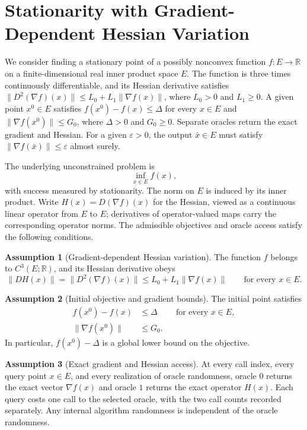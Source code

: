 \documentclass[10pt]{article}
\theoremstyle{definition}
\newtheorem{assumption}{Assumption}
\begin{document}
\section*{Stationarity with Gradient-Dependent Hessian Variation}
We consider finding a stationary point of a possibly nonconvex function $f:E\to\mathbb{R}$ on a finite-dimensional real inner product space $E$. The function is three times continuously differentiable, and its Hessian derivative satisfies $\|D^2(\nabla f)(x)\|\leq L_0+L_1\|\nabla f(x)\|$, where $L_0>0$ and $L_1\geq0$. A given point $x^0\in E$ satisfies $f(x^0)-f(x)\leq\Delta$ for every $x\in E$ and $\|\nabla f(x^0)\|\leq G_0$, where $\Delta>0$ and $G_0\geq0$. Separate oracles return the exact gradient and Hessian. For a given $\varepsilon>0$, the output $\bar{x}\in E$ must satisfy $\|\nabla f(\bar{x})\|\leq\varepsilon$ almost surely.

The underlying unconstrained problem is
\[
\inf_{x\in E} f(x),
\]
with success measured by stationarity. The norm on $E$ is induced by its inner product. Write $H(x)=D(\nabla f)(x)$ for the Hessian, viewed as a continuous linear operator from $E$ to $E$; derivatives of operator-valued maps carry the corresponding operator norms. The admissible objectives and oracle access satisfy the following conditions.

\begin{assumption}[Gradient-dependent Hessian variation]
The function $f$ belongs to $C^3(E;\mathbb{R})$, and its Hessian derivative obeys
\[
\|DH(x)\|=\|D^2(\nabla f)(x)\|
\leq L_0+L_1\|\nabla f(x)\|
\qquad \text{for every }x\in E.
\]
\end{assumption}

\begin{assumption}[Initial objective and gradient bounds]
The initial point satisfies
\[
\begin{aligned}
f(x^0)-f(x)&\leq\Delta
&&\text{for every }x\in E,\\
\|\nabla f(x^0)\|&\leq G_0.
\end{aligned}
\]
In particular, $f(x^0)-\Delta$ is a global lower bound on the objective.
\end{assumption}

\begin{assumption}[Exact gradient and Hessian access]
At every call index, every query point $x\in E$, and every realization of oracle randomness, oracle $0$ returns the exact vector $\nabla f(x)$ and oracle $1$ returns the exact operator $H(x)$. Each query costs one call to the selected oracle, with the two call counts recorded separately. Any internal algorithm randomness is independent of the oracle randomness.
\end{assumption}
\end{document}
